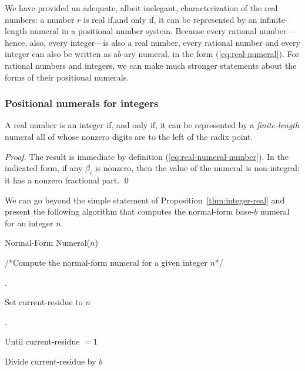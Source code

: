 We have provided an adequate, albeit inelegant, characterization of
the real numbers: a number $r$ is real if,and only if, it can be
represented by an infinite-length numeral in a positional number
system.  Because every rational number---hence, also, every
integer---is also a real number, every rational number and every
integer can also be written as a$b$-ary numeral, in the form
(\ref{eq:real-numeral}).  For rational numbers and integers, we can
make much stronger statements about the forms of their positional
numerals.

\subsubsection{Positional numerals for integers}
\label{sec:special-numerals-N}

\begin{prop}
\label{thm:integer-real}
A real number is an integer if, and only if, it can be represented by
a {\em finite-length} numeral all of whose nonzero digits are to the
left of the radix point.
\end{prop}

\begin{proof}
The result is immediate by definition (\ref{eq:real-numeral-number}).
In the indicated form, if any $\beta_i$ is nonzero, then the {\sc
value} of the numeral is non-integral: it has a nonzero fractional part.
\qed
\end{proof}

We can go beyond the simple statement of
Proposition~\ref{thm:integer-real} and present the following algorithm
that computes the normal-form base-$b$ numeral for an integer $n$.

\bigskip

 {\small\sf Normal-Form
  Numeral}($n$)

/*Compute the normal-form numeral for a given integer $n$*/

\smallskip

.

Set {\sc current-residue} to $n$

\smallskip

. 

Until {\sc current-residue} $= 1$

Divide {\sc current-residue} by $b$

\medskip

